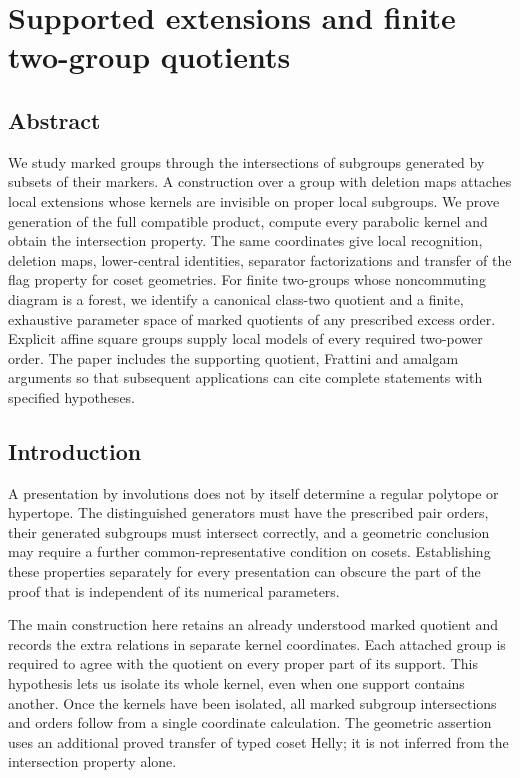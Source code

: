 \documentclass[
  11pt,
  a4paper,
]{article}
\author{}
\date{}
\begin{document}
\section{Supported extensions and finite two-group
quotients}\label{supported-extensions-and-finite-two-group-quotients}

\subsection{Abstract}\label{abstract}

We study marked groups through the intersections of subgroups generated
by subsets of their markers. A construction over a group with deletion
maps attaches local extensions whose kernels are invisible on proper
local subgroups. We prove generation of the full compatible product,
compute every parabolic kernel and obtain the intersection property. The
same coordinates give local recognition, deletion maps, lower-central
identities, separator factorizations and transfer of the flag property
for coset geometries. For finite two-groups whose noncommuting diagram
is a forest, we identify a canonical class-two quotient and a finite,
exhaustive parameter space of marked quotients of any prescribed excess
order. Explicit affine square groups supply local models of every
required two-power order. The paper includes the supporting quotient,
Frattini and amalgam arguments so that subsequent applications can cite
complete statements with specified hypotheses.

\subsection{Introduction}\label{introduction}

A presentation by involutions does not by itself determine a regular
polytope or hypertope. The distinguished generators must have the
prescribed pair orders, their generated subgroups must intersect
correctly, and a geometric conclusion may require a further
common-representative condition on cosets. Establishing these properties
separately for every presentation can obscure the part of the proof that
is independent of its numerical parameters.

The main construction here retains an already understood marked quotient
and records the extra relations in separate kernel coordinates. Each
attached group is required to agree with the quotient on every proper
part of its support. This hypothesis lets us isolate its whole kernel,
even when one support contains another. Once the kernels have been
isolated, all marked subgroup intersections and orders follow from a
single coordinate calculation. The geometric assertion uses an
additional proved transfer of typed coset Helly; it is not inferred from
the intersection property alone.
\end{document}
